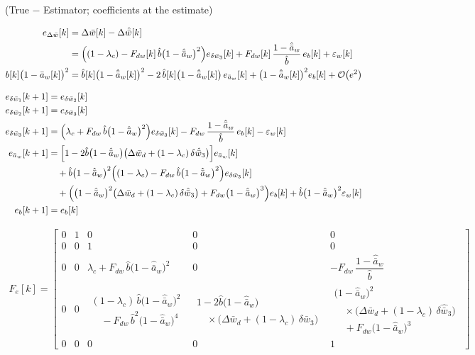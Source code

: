 \documentclass[11pt,a4paper,fontset=none]{ctexart}
\newcommand{\ba}{\bar{a}}
\newcommand{\bw}{\bar{w}}
\newcommand{\dW}{\Delta\bw}
\newcommand{\dWh}{\Delta\hat{\bw}}
\newcommand{\eD}{e_{\Delta\bw}}
\newcommand{\ah}{\hat{\ba}_w}
\newcommand{\bh}{\hat{b}}
\begin{document}
(True $-$ Estimator; coefficients at the estimate)

\begin{align*}
\eD[k] &= \dW[k] - \dWh[k] \\
       &= \Bigl((1-\lambda_c) - F_{dw}[k]\,\bh\bigl(1-\ah\bigr)^{2}\Bigr)e_{\delta\bw_3}[k]
          + F_{dw}[k]\,\frac{1-\ah}{\bh}\,e_b[k] + \varepsilon_w[k] \\
b[k]\bigl(1-\ba_w[k]\bigr)^{2} &= \bh[k]\bigl(1-\ah[k]\bigr)^{2} - 2\,\bh[k]\bigl(1-\ah[k]\bigr)\,e_{\ba_w}[k] + \bigl(1-\ah[k]\bigr)^{2}e_b[k] + \mathcal{O}\bigl(e^{2}\bigr)
\end{align*}

\begin{align*}
e_{\delta\bw_1}[k+1] &= e_{\delta\bw_2}[k] \\
e_{\delta\bw_2}[k+1] &= e_{\delta\bw_3}[k] \\
e_{\delta\bw_3}[k+1] &= \Bigl(\lambda_c + F_{dw}\,\bh\bigl(1-\ah\bigr)^{2}\Bigr)e_{\delta\bw_3}[k]
                        - F_{dw}\,\frac{1-\ah}{\bh}\,e_b[k] - \varepsilon_w[k] \\
e_{\ba_w}[k+1] &= \Bigl[1 - 2\bh\bigl(1-\ah\bigr)\bigl(\Delta\bw_d + (1-\lambda_c)\,\delta\hat{\bw}_3\bigr)\Bigr]e_{\ba_w}[k] \\
  &\quad + \bh\bigl(1-\ah\bigr)^{2}\Bigl((1-\lambda_c) - F_{dw}\,\bh\bigl(1-\ah\bigr)^{2}\Bigr)e_{\delta\bw_3}[k] \\
  &\quad + \Bigl(\bigl(1-\ah\bigr)^{2}\bigl(\Delta\bw_d + (1-\lambda_c)\,\delta\hat{\bw}_3\bigr) + F_{dw}\bigl(1-\ah\bigr)^{3}\Bigr)e_b[k]
         + \bh\bigl(1-\ah\bigr)^{2}\varepsilon_w[k] \\
e_b[k+1] &= e_b[k]
\end{align*}

\begin{align*}
F_e[k] = \begin{bmatrix}
0 & 1 & 0 & 0 & 0 \\[2pt]
0 & 0 & 1 & 0 & 0 \\[2pt]
0 & 0 & \lambda_c + F_{dw}\,\bh\bigl(1-\ah\bigr)^{2} & 0 & -F_{dw}\,\dfrac{1-\ah}{\bh} \\[12pt]
0 & 0 &
  \begin{array}{l} (1-\lambda_c)\,\bh\bigl(1-\ah\bigr)^{2} \\[2pt] \quad - F_{dw}\,\bh^{2}\bigl(1-\ah\bigr)^{4} \end{array} &
  \begin{array}{l} 1 - 2\bh\bigl(1-\ah\bigr) \\[2pt] \quad \times\bigl(\Delta\bw_d + (1-\lambda_c)\,\delta\hat{\bw}_3\bigr) \end{array} &
  \begin{array}{l} \bigl(1-\ah\bigr)^{2} \\[2pt] \quad \times\bigl(\Delta\bw_d + (1-\lambda_c)\,\delta\hat{\bw}_3\bigr) \\[2pt] \quad + F_{dw}\bigl(1-\ah\bigr)^{3} \end{array} \\[20pt]
0 & 0 & 0 & 0 & 1
\end{bmatrix}
\end{align*}
\end{document}
